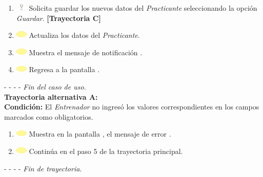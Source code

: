 \begin{enumerate}
	\item \includegraphics[width=15pt, height=10pt]{./Figuras/iconosCU/usuario.png} Solicita guardar los nuevos datos del \textit{Practicante} seleccionando la opción \textit{Guardar}. \textbf{[Trayectoria C]}
	\item \includegraphics[width=15pt]{./Figuras/iconosCU/herramienta.png} Actualiza los datos del \textit{Practicante}.
	\item \includegraphics[width=15pt]{./Figuras/iconosCU/herramienta.png} Muestra el mensaje de notificación .
	\item \includegraphics[width=15pt]{./Figuras/iconosCU/herramienta.png} Regresa a la pantalla .
\end{enumerate}
	
- - - - \textit{Fin del caso de uso.} \\

\textbf{\large{Trayectoria alternativa A:}}\\
\textbf{Condición: } El \textit{Entrenador} no ingresó los valores correspondientes en los campos marcados como obligatorios.

\begin{enumerate}
	\item \includegraphics[width=15pt]{./Figuras/iconosCU/herramienta.png} Muestra en la pantalla , el mensaje de error .
	\item \includegraphics[width=15pt]{./Figuras/iconosCU/herramienta.png} Continúa en el paso 5 de la trayectoria principal.
\end{enumerate}

- - - - \textit{Fin de trayectoria.} \\

